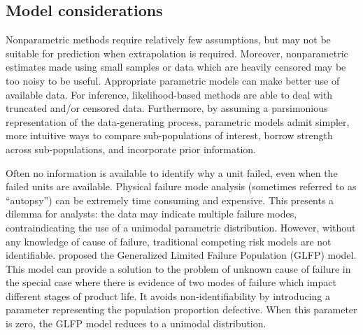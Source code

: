 \documentclass[12pt]{article}
\begin{document}
\subsection{Model considerations}
Nonparametric methods require relatively few assumptions, but may not be suitable for prediction when extrapolation is required. Moreover, nonparametric estimates made using small samples or data which are heavily censored may be too noisy to be useful. Appropriate parametric models can make better use of available data. For inference, likelihood-based methods are able to deal with truncated and/or censored data. Furthermore, by assuming a parsimonious representation of the data-generating process, parametric models admit simpler, more intuitive ways to compare sub-populations of interest, borrow strength across sub-populations, and incorporate prior information. 

Often no information is available to identify why a unit failed, even when the failed units are available. Physical failure mode analysis (sometimes referred to as ``autopsy'') can be extremely time consuming and expensive. This presents a dilemma for analysts: the data may indicate multiple failure modes, contraindicating the use of a unimodal parametric distribution. However, without any knowledge of cause of failure, traditional competing risk models are not identifiable. \citet{chan} proposed the Generalized Limited Failure Population (GLFP) model. This model can provide a solution to the problem of unknown cause of failure in the special case where there is evidence of two modes of failure which impact different stages of product life. It avoids non-identifiability by introducing a parameter representing the population proportion defective. When this parameter is zero, the GLFP model reduces to a unimodal distribution. \\
\end{document}

